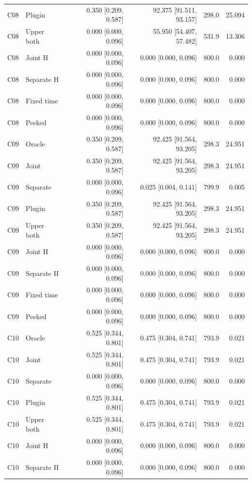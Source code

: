 \begin{longtable}{llrrrr}
C08 & Plugin & 0.350 [0.209, 0.587] & 92.375 [91.511, 93.157] & 298.0 & 25.094\\
C08 & Upper both & 0.000 [0.000, 0.096] & 55.950 [54.407, 57.482] & 531.9 & 13.306\\
C08 & Joint H & 0.000 [0.000, 0.096] & 0.000 [0.000, 0.096] & 800.0 & 0.000\\
C08 & Separate H & 0.000 [0.000, 0.096] & 0.000 [0.000, 0.096] & 800.0 & 0.000\\
C08 & Fixed time & 0.000 [0.000, 0.096] & 0.000 [0.000, 0.096] & 800.0 & 0.000\\
C08 & Peeked & 0.000 [0.000, 0.096] & 0.000 [0.000, 0.096] & 800.0 & 0.000\\
C09 & Oracle & 0.350 [0.209, 0.587] & 92.425 [91.564, 93.205] & 298.3 & 24.951\\
C09 & Joint & 0.350 [0.209, 0.587] & 92.425 [91.564, 93.205] & 298.3 & 24.951\\
C09 & Separate & 0.000 [0.000, 0.096] & 0.025 [0.004, 0.141] & 799.9 & 0.005\\
C09 & Plugin & 0.350 [0.209, 0.587] & 92.425 [91.564, 93.205] & 298.3 & 24.951\\
C09 & Upper both & 0.350 [0.209, 0.587] & 92.425 [91.564, 93.205] & 298.3 & 24.951\\
C09 & Joint H & 0.000 [0.000, 0.096] & 0.000 [0.000, 0.096] & 800.0 & 0.000\\
C09 & Separate H & 0.000 [0.000, 0.096] & 0.000 [0.000, 0.096] & 800.0 & 0.000\\
C09 & Fixed time & 0.000 [0.000, 0.096] & 0.000 [0.000, 0.096] & 800.0 & 0.000\\
C09 & Peeked & 0.000 [0.000, 0.096] & 0.000 [0.000, 0.096] & 800.0 & 0.000\\
C10 & Oracle & 0.525 [0.344, 0.801] & 0.475 [0.304, 0.741] & 793.9 & 0.021\\
C10 & Joint & 0.525 [0.344, 0.801] & 0.475 [0.304, 0.741] & 793.9 & 0.021\\
C10 & Separate & 0.000 [0.000, 0.096] & 0.000 [0.000, 0.096] & 800.0 & 0.000\\
C10 & Plugin & 0.525 [0.344, 0.801] & 0.475 [0.304, 0.741] & 793.9 & 0.021\\
C10 & Upper both & 0.525 [0.344, 0.801] & 0.475 [0.304, 0.741] & 793.9 & 0.021\\
C10 & Joint H & 0.000 [0.000, 0.096] & 0.000 [0.000, 0.096] & 800.0 & 0.000\\
C10 & Separate H & 0.000 [0.000, 0.096] & 0.000 [0.000, 0.096] & 800.0 & 0.000\\

\end{longtable}
